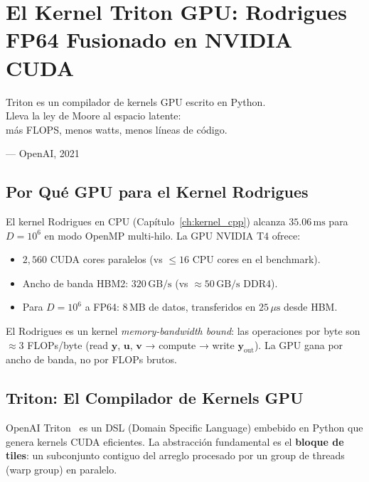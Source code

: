 \chapter{El Kernel Triton GPU: Rodrigues FP64 Fusionado en NVIDIA CUDA}
\label{ch:triton}

\epigraph{Triton es un compilador de kernels GPU escrito en Python.\\
Lleva la ley de Moore al espacio latente:\\
más FLOPS, menos watts, menos líneas de código.}{--- OpenAI, 2021}

\section{Por Qué GPU para el Kernel Rodrigues}

El kernel Rodrigues en CPU (Capítulo~\ref{ch:kernel_cpp}) alcanza $35.06\,\text{ms}$
para $D = 10^6$ en modo OpenMP multi-hilo. La GPU NVIDIA T4 ofrece:

\begin{itemize}
\item $2{,}560$ CUDA cores paralelos (vs $\le 16$ CPU cores en el benchmark).
\item Ancho de banda HBM2: $320\,\text{GB/s}$ (vs $\approx 50\,\text{GB/s}$ DDR4).
\item Para $D = 10^6$ a FP64: $8\,\text{MB}$ de datos, transferidos en $25\,\mu\text{s}$ desde HBM.
\end{itemize}

El Rodrigues es un kernel \textit{memory-bandwidth bound}: las operaciones por
byte son $\approx 3$ FLOPs/byte (read $\mathbf{y}$, $\mathbf{u}$, $\mathbf{v}$ → compute → write $\mathbf{y}_\text{out}$).
La GPU gana por ancho de banda, no por FLOPs brutos.

\section{Triton: El Compilador de Kernels GPU}

OpenAI Triton~\cite{tillet2019triton} es un DSL (Domain Specific Language)
embebido en Python que genera kernels CUDA eficientes. La abstracción fundamental
es el \textbf{bloque de tiles}: un subconjunto contiguo del arreglo procesado por
un group de threads (warp group) en paralelo.

